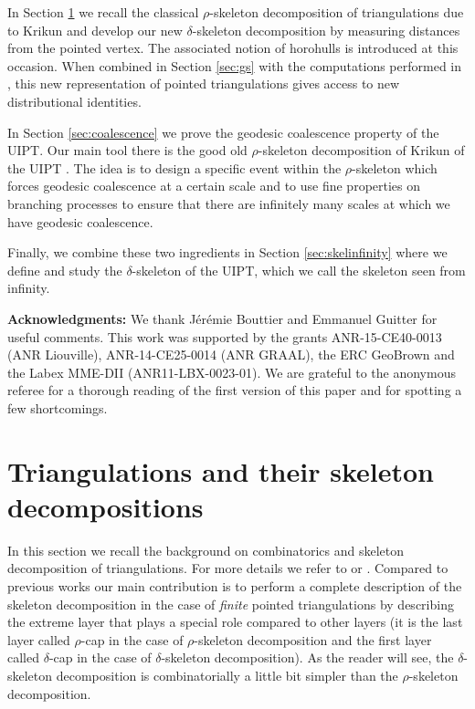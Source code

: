 \documentclass[AHL,XML,longabstracts,Unicode,NoSaveZebib]{cedram}
\begin{document}
In Section \ref{sec:skeletongeneral} we recall the classical $\rho$-skeleton decomposition of triangulations due to Krikun and develop our new $\delta$-skeleton decomposition by measuring distances from the pointed vertex. The associated notion of horohulls is introduced at this occasion. When combined  in Section \ref{sec:gs} with the computations performed in \cite{M}, this new representation of pointed triangulations gives access to new distributional identities.

In Section \ref{sec:coalescence} we prove the geodesic coalescence property of the UIPT. Our main tool there is the good old $\rho$-skeleton decomposition of Krikun of the UIPT \cite{Kr}. The idea is to design a specific event within the $\rho$-skeleton which forces geodesic coalescence at a certain scale and to use fine properties on branching processes to ensure that there are infinitely many scales at which we have geodesic coalescence.

Finally, we combine these two ingredients in Section \ref{sec:skelinfinity} where we define and study the $\delta$-skeleton of the UIPT, which we call the skeleton seen from infinity.

\bigskip

\noindent \textbf{Acknowledgments:} We thank J\'er\'emie Bouttier and Emmanuel Guitter for useful comments. This work was supported by the grants ANR-15-CE40-0013 (ANR Liouville),
ANR-14-CE25-0014 (ANR GRAAL), the ERC GeoBrown and the Labex MME-DII (ANR11-LBX-0023-01). {We are grateful to the anonymous referee for a thorough reading of the first version of this paper and for spotting a few shortcomings.}

\tableofcontents


\section{Triangulations and their skeleton decompositions} \label{sec:skeletongeneral}
In this section we recall the background on combinatorics and skeleton decomposition of triangulations. For more details we refer to \cite{CLGfpp} or \cite{M}. Compared to previous works our main contribution is to perform a complete description of the skeleton decomposition in the case of \emph{finite} pointed triangulations by describing the extreme layer that plays a special role compared to other layers (it is the last layer called $\rho$-cap in the case of $\rho$-skeleton decomposition and the first layer called $\delta$-cap in the case of $\delta$-skeleton decomposition). As the reader will see, the $\delta$-skeleton decomposition is combinatorially a little bit simpler than the $\rho$-skeleton decomposition.
\end{document}
